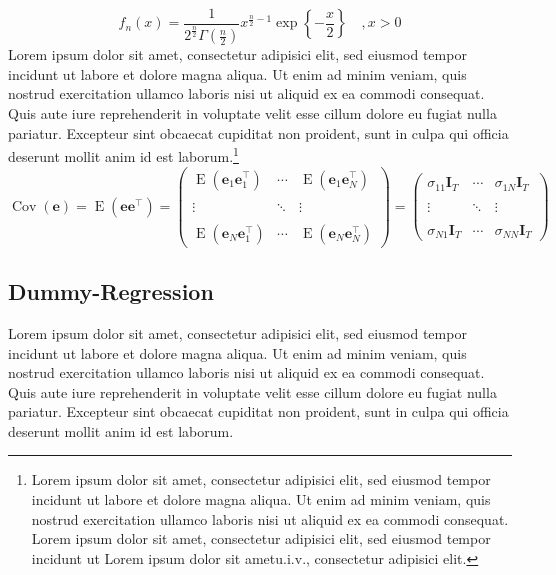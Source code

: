 %
\begin{equation}
f_n(x) =  \frac{1}{2^{\frac{n}{2}}\Gamma(\tfrac{n}{2})} x^{\frac{n}{2}-1}\operatorname{exp}\left\{ -\frac x2\right\} \quad, x > 0 
 \end{equation} 
%
Lorem ipsum dolor sit amet, consectetur adipisici elit, sed eiusmod tempor incidunt ut labore et dolore magna aliqua. Ut enim ad minim veniam, quis nostrud exercitation ullamco laboris nisi ut aliquid ex ea commodi consequat. Quis aute iure reprehenderit in voluptate velit esse cillum dolore eu fugiat nulla pariatur. Excepteur sint obcaecat cupiditat non proident, sunt in culpa qui officia deserunt mollit anim id est laborum.\footnote{Lorem ipsum dolor sit amet, consectetur adipisici elit, sed eiusmod tempor incidunt ut labore et dolore magna aliqua. Ut enim ad minim veniam, quis nostrud exercitation ullamco laboris nisi ut aliquid ex ea commodi consequat.\hspace*{5mm} Lorem ipsum dolor sit amet, consectetur adipisici elit, sed eiusmod tempor incidunt ut \hspace*{5mm} Lorem ipsum dolor sit amet\ac{u.i.v.}, consectetur adipisici elit.}
 \begin{equation*}
\operatorname{Cov}(\mathbf e)=\operatorname{E}(\mathbf e \mathbf e^{\top})
= \begin{pmatrix}
 \operatorname{E}(\boldsymbol e_1 \boldsymbol e_1^{\top}) & \cdots & \operatorname{E}(\boldsymbol e_1 \boldsymbol e_N^{\top}) \\ \\
 \vdots & \ddots &  \vdots \\ \\
 \operatorname{E}(\boldsymbol e_N \boldsymbol e_1^{\top}) & \cdots & \operatorname{E}(\boldsymbol e_N \boldsymbol e_N^{\top})
\end{pmatrix}= \begin{pmatrix}
 \sigma_{11}\mathbf I_T  & \cdots &\sigma_{1N}\mathbf I_T  \\ \\
 \vdots & \ddots & \vdots   \\ \\
\sigma_{N1}\mathbf I_T  & \cdots &\sigma_{NN}\mathbf I_T
\end{pmatrix}
\end{equation*}

\subsection{Dummy-Regression}
Lorem ipsum dolor sit amet, consectetur adipisici elit, sed eiusmod tempor incidunt ut labore et dolore magna aliqua. Ut enim ad minim veniam, quis nostrud exercitation ullamco laboris nisi ut aliquid ex ea commodi consequat. Quis aute iure reprehenderit in voluptate velit esse cillum dolore eu fugiat nulla pariatur. Excepteur sint obcaecat cupiditat non proident, sunt in culpa qui officia deserunt mollit anim id est laborum.

